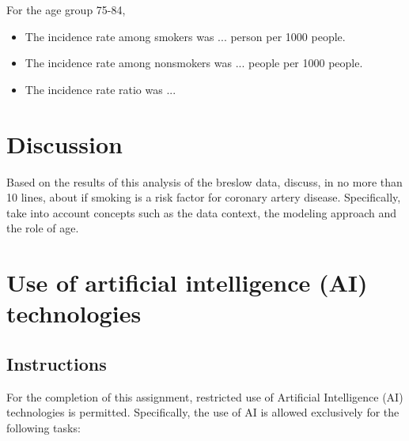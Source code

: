 \documentclass[10pt,a4paper,twoside]{article}\usepackage[]{graphicx}\usepackage[]{xcolor}
\begin{document}
\[
\]
For the age group 75-84, \begin{itemize}
    \item The incidence rate among smokers was ... person per 1000 people.
    \item The incidence rate among nonsmokers was ... people per 1000 people.
    \item The incidence rate ratio was ...
\end{itemize}
      


\section{Discussion}
\label{sec:Discussion}

Based on the results of this analysis of the breslow data, discuss, in no more than 10 lines, about if smoking is a risk factor for coronary artery disease. Specifically, take into account concepts such as the data context, the modeling approach and the role of age.

\section{Use of artificial intelligence (AI) technologies}
\label{sec:AIuse}
\subsection{Instructions}
\label{sec:Instructions}
For the completion of this assignment, restricted use of Artificial Intelligence (AI) technologies is permitted. Specifically, the use of AI is allowed exclusively for the following tasks:
\end{document}
